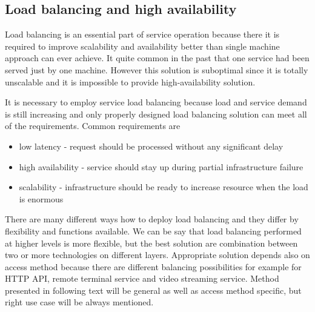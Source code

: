 \subsection{Load balancing and high availability}

Load balancing is an essential part of service operation because there it is required to improve scalability and availability better than single machine approach can ever achieve. It  quite common in the past that one service had been served just by one machine. However this solution is suboptimal since it is totally unscalable and it is impossible to provide high-availability solution.

It is necessary to employ service load balancing because load and service demand is still increasing and only properly designed load balancing solution can meet all of the requirements. Common requirements are
	\begin{itemize}
		\item low latency - request should be processed without any significant delay
		\item high availability - service should stay up during partial infrastructure failure
		\item scalability - infrastructure should be ready to increase resource when the load is enormous
	\end{itemize}

There are many different ways how to deploy load balancing and they differ by flexibility and functions available. We can be say that load balancing performed at higher levels is more flexible, but the best solution are combination between two or more technologies on different layers. Appropriate solution depends also on access method because there are different balancing possibilities for example for \Ac{HTTP} \Ac{API}, remote terminal service and video streaming service. Method presented in following text will be general as well as access method specific, but right use case will be always mentioned.

